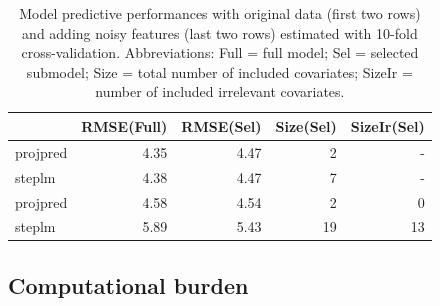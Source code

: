 \documentclass[american,]{article}
\theoremstyle{definition}
\begin{document}
\begin{table}[tp]
\scriptsize
\centering
\begin{tabular}{l|r|r|r|r}
  \hline
 & RMSE(Full) & RMSE(Sel) & Size(Sel) & SizeIr(Sel) \\ 
  \hline
projpred & 4.35 & 4.47 & 2 & -  \\
steplm & 4.38 & 4.47 & 7 & - \\
\hline
\hline
projpred & 4.58 & 4.54 & 2 & 0  \\
steplm & 5.89 & 5.43 & 19 & 13 \\
   \hline
\end{tabular}
\caption{Model predictive performances with original data (first two rows) and adding noisy features (last two rows) estimated with 10-fold cross-validation. Abbreviations: Full = full model; Sel = selected submodel; Size = total number of included covariates; SizeIr = number of included irrelevant covariates.}
\label{tab:model_performances}
\end{table}


\hypertarget{computational-burden}{%
\subsection{Computational burden} \label{computational-burden}}
\end{document}
